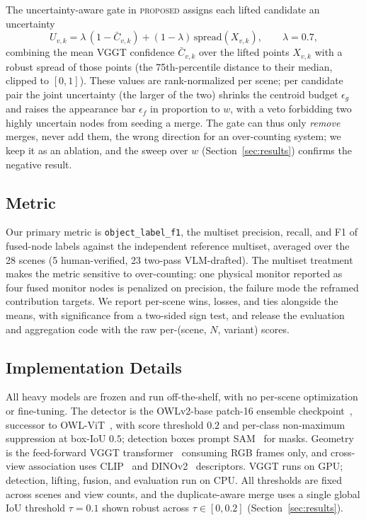 The uncertainty-aware gate in \textsc{proposed} assigns each lifted candidate an uncertainty
\begin{equation}
    U_{v,k} = \lambda\,(1-\bar{C}_{v,k}) + (1-\lambda)\,\mathrm{spread}(X_{v,k}), \qquad \lambda = 0.7,
\end{equation}
combining the mean VGGT confidence $\bar{C}_{v,k}$ over the lifted points $X_{v,k}$ with a robust spread of those points (the 75th-percentile distance to their median, clipped to $[0,1]$). These values are rank-normalized per scene; per candidate pair the joint uncertainty (the larger of the two) shrinks the centroid budget $\epsilon_g$ and raises the appearance bar $\epsilon_f$ in proportion to $w$, with a veto forbidding two highly uncertain nodes from seeding a merge. The gate can thus only \emph{remove} merges, never add them, the wrong direction for an over-counting system; we keep it as an ablation, and the sweep over $w$ (Section~\ref{sec:results}) confirms the negative result.

\subsection{Metric}
\label{sec:exp_metric}

Our primary metric is \texttt{object\_label\_f1}, the multiset precision, recall, and F1 of fused-node labels against the independent reference multiset, averaged over the 28 scenes (5 human-verified, 23 two-pass VLM-drafted). The multiset treatment makes the metric sensitive to over-counting: one physical monitor reported as four fused monitor nodes is penalized on precision, the failure mode the reframed contribution targets. We report per-scene wins, losses, and ties alongside the means, with significance from a two-sided sign test, and release the evaluation and aggregation code with the raw per-(scene, $N$, variant) scores.

\subsection{Implementation Details}
\label{sec:exp_impl}

All heavy models are frozen and run off-the-shelf, with no per-scene optimization or fine-tuning. The detector is the OWLv2-base patch-16 ensemble checkpoint~\cite{minderer2023owlv2}, successor to OWL-ViT~\cite{minderer2022owlvit}, with score threshold $0.2$ and per-class non-maximum suppression at box-IoU $0.5$; detection boxes prompt SAM~\cite{kirillov2023segment} for masks. Geometry is the feed-forward VGGT transformer~\cite{wang2025vggt} consuming RGB frames only, and cross-view association uses CLIP~\cite{radford2021clip} and DINOv2~\cite{oquab2023dinov2} descriptors. VGGT runs on GPU; detection, lifting, fusion, and evaluation run on CPU. All thresholds are fixed across scenes and view counts, and the duplicate-aware merge uses a single global IoU threshold $\tau{=}0.1$ shown robust across $\tau\in[0,0.2]$ (Section~\ref{sec:results}).


